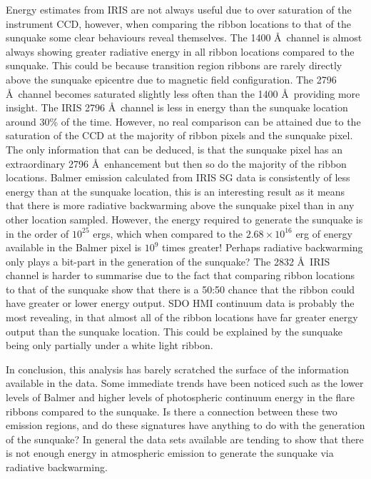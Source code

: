 Energy estimates from IRIS are not always useful due to over saturation of the instrument CCD, however, when comparing the ribbon locations to that of the sunquake some clear behaviours reveal themselves. The 1400 \AA\ channel is almost always showing greater radiative energy in all ribbon locations compared to the sunquake. This could be because transition region ribbons are rarely directly above the sunquake epicentre due to magnetic field configuration. The 2796 \AA\ channel becomes saturated slightly less often than the 1400 \AA\, providing more insight. The IRIS 2796 \AA\ channel is less in energy than the sunquake location around 30\% of the time. However, no real comparison can be attained due to the saturation of the CCD at the majority of ribbon pixels and the sunquake pixel. The only information that can be deduced, is that the sunquake pixel has an extraordinary 2796 \AA\ enhancement but then so do the majority of the ribbon locations. Balmer emission calculated from IRIS SG data is consistently of less energy than at the sunquake location, this is an interesting result as it means that there is more radiative backwarming above the sunquake pixel than in any other location sampled. However, the energy required to generate the sunquake is in the order of $10^25$ ergs, which when compared to the $2.68{\times}10^{16}$ erg of energy available in the Balmer pixel is $10^{9}$ times greater! Perhaps radiative backwarming only plays a bit-part in the generation of the sunquake?  
The 2832 \AA\ IRIS channel is harder to summarise due to the fact that comparing ribbon locations to that of the sunquake show that there is a 50:50 chance that the ribbon could have greater or lower energy output.
SDO HMI continuum data is probably the most revealing, in that almost all of the ribbon locations have far greater energy output than the sunquake location. This could be explained by the sunquake being only partially under a white light ribbon. 

In conclusion, this analysis has barely scratched the surface of the information available in the data. Some immediate trends have been noticed such as the lower levels of Balmer and higher levels of photospheric continuum energy in the flare ribbons compared to the sunquake. Is there a connection between these two emission regions, and do these signatures have anything to do with the generation of the sunquake? In general the data sets available are tending to show that there is not enough energy in atmospheric emission to generate the sunquake via radiative backwarming.

